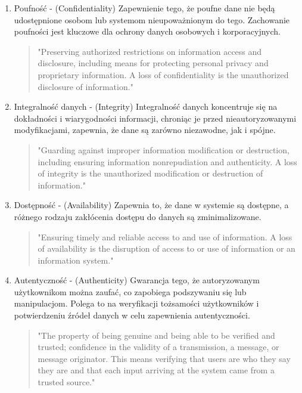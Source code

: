 \documentclass[runningheads,12pt]{llncs}
\begin{document}
\begin{enumerate}
    \item Poufność - (Confidentiality) Zapewnienie tego, że poufne dane nie będą udostępnione osobom lub systemom nieupoważnionym do tego. Zachowanie poufności jest kluczowe dla ochrony danych osobowych i korporacyjnych.
    \begin{quote}
        "Preserving authorized restrictions on information access and disclosure, including means for protecting personal privacy and proprietary information. A loss of confidentiality is the unauthorized disclosure of information." ~\cite[p. 22]{stallings2017cryptography}
    \end{quote}
    \item Integralność danych - (Integrity) Integralność danych koncentruje się na dokładności i wiarygodności informacji, chroniąc je przed nieautoryzowanymi modyfikacjami, zapewnia, że dane są zarówno niezawodne, jak i spójne.
    \begin{quote}
        "Guarding against improper information modification or destruction, including ensuring information nonrepudiation and authenticity. A loss of integrity is the unauthorized modification or destruction of information." ~\cite[p. 22]{stallings2017cryptography}
    \end{quote}
    \item Dostępność - (Availability) Zapewnia to, że dane w systemie są dostępne, a różnego rodzaju zakłócenia dostępu do danych są zminimalizowane.
    \begin{quote}
        "Ensuring timely and reliable access to and use of information. A loss of availability is the disruption of access to or use of information or an information system." ~\cite[p. 22]{stallings2017cryptography}
    \end{quote}
    \item Autentyczność - (Authenticity) Gwarancja tego, że autoryzowanym użytkownikom można zaufać, co zapobiega podszywaniu się lub manipulacjom. Polega to na weryfikacji tożsamości użytkowników i potwierdzeniu źródeł danych w celu zapewnienia autentyczności.
    \begin{quote}
        "The property of being genuine and being able to be verified and trusted; confidence in the validity of a transmission, a message, or message originator. This means verifying that users are who they say they are and that each input arriving at the system came from a trusted source." ~\cite[p. 23]{stallings2017cryptography}
    \end{quote}

\end{enumerate}
\end{document}
